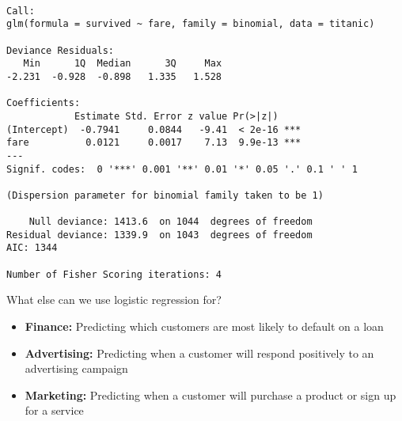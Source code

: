 \documentclass{beamer}\usepackage[]{graphicx}\usepackage[]{color}
\makeatletter
\newenvironment{kframe}{%
 \def\at@end@of@kframe{}%
 \ifinner\ifhmode%
  \def\at@end@of@kframe{\end{minipage}}%
  \begin{minipage}{\columnwidth}%
 \fi\fi%
 \def\FrameCommand##1{\hskip\@totalleftmargin \hskip-\fboxsep
 \colorbox{shadecolor}{##1}\hskip-\fboxsep
     \hskip-\linewidth \hskip-\@totalleftmargin \hskip\columnwidth}%
 \MakeFramed {\advance\hsize-\width
   \@totalleftmargin\z@ \linewidth\hsize
   \@setminipage}}%
 {\par\unskip\endMakeFramed%
 \at@end@of@kframe}
\newenvironment{knitrout}{}{} %
\makeatother
\begin{document}
\begin{darkframes}
\begin{frame}[fragile]
      \fontsize{9}{9}\selectfont
\begin{knitrout}
\begin{kframe}
\begin{verbatim}

Call:
glm(formula = survived ~ fare, family = binomial, data = titanic)

Deviance Residuals: 
   Min      1Q  Median      3Q     Max  
-2.231  -0.928  -0.898   1.335   1.528  

Coefficients:
            Estimate Std. Error z value Pr(>|z|)    
(Intercept)  -0.7941     0.0844   -9.41  < 2e-16 ***
fare          0.0121     0.0017    7.13  9.9e-13 ***
---
Signif. codes:  0 '***' 0.001 '**' 0.01 '*' 0.05 '.' 0.1 ' ' 1

(Dispersion parameter for binomial family taken to be 1)

    Null deviance: 1413.6  on 1044  degrees of freedom
Residual deviance: 1339.9  on 1043  degrees of freedom
AIC: 1344

Number of Fisher Scoring iterations: 4
\end{verbatim}
\end{kframe}
\end{knitrout}
\end{frame}

    \begin{frame}{What else can we use logistic regression for?}
      \begin{itemize}
        \item \textbf{Finance:} Predicting which customers are most likely to default on a loan
        \item \textbf{Advertising:} Predicting when a customer will respond positively to an advertising campaign
        \item \textbf{Marketing:} Predicting when a customer will purchase a product or sign up for a service
      \end{itemize}
    \end{frame}
  \end{darkframes}
\end{document}
